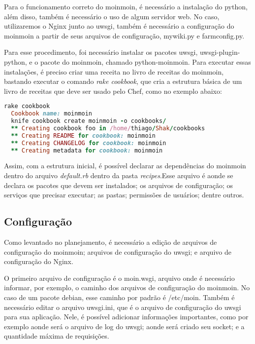 Para o funcionamento correto do moinmoin, é necessário a instalação do python, além
disso, também é necessário o uso de algum servidor web. No caso, utilizaremos o Nginx
junto ao uwsgi, também é necessário a configuração do moinmoin a partir de seus
arquivos de configuração, mywiki.py e farmconfig.py.

Para esse procedimento, foi necessário instalar os pacotes uwsgi,
uwsgi-plugin-python, e o pacote do moinmoin, chamado python-moinmoin.
Para executar essas instalações, é preciso criar uma receita no livro de receitas
do moinmoin, bastando executar o comando \textit{rake cookbook}, que cria a
estrutura básica de um livro de receitas que deve ser usado pelo Chef, como no exemplo
abaixo:

\begin{lstlisting}[language=Ruby,label=dice_index,caption={Exemplo de criação de estrutura básica de livro de receitas do moinmoin com shak}]
  rake cookbook
  Cookbook name: moinmoin
  knife cookbook create moinmoin -o cookbooks/
  ** Creating cookbook foo in /home/thiago/Shak/cookbooks
  ** Creating README for cookbook: moinmoin
  ** Creating CHANGELOG for cookbook: moinmoin
  ** Creating metadata for cookbook: moinmoin
\end{lstlisting}

Assim, com a estrutura inicial, é possível declarar as dependências do moinmoin
dentro do arquivo \textit{default.rb} dentro da pasta \textit{recipes}.Esse arquivo 
é aonde se declara os pacotes que devem ser instalados; os arquivos de configuração;
os serviços que precisar executar; as pastas; permissões de usuários; dentre outros.

\subsection{Configuração}

Como levantado no planejamento, é necessário a edição de arquivos de configuração
do moinmoin; arquivos de configuração do uwsgi; e arquivo de configuração
do Nginx.

O primeiro arquivo de configuração é o moin.wsgi, arquivo onde é necessário
informar, por exemplo, o caminho dos arquivos de configuração do moinmoin. No caso
de um pacote debian, esse caminho por padrão é  /etc/moin. Também é necessário 
editar o arquivo uwsgi.ini, que é o arquivo de configuração
do uwsgi para sua aplicação. Nele, é possível adicionar informações importantes, como
por exemplo aonde será o arquivo de log do uwsgi; aonde será criado seu socket;
e a quantidade máxima de requisições.

